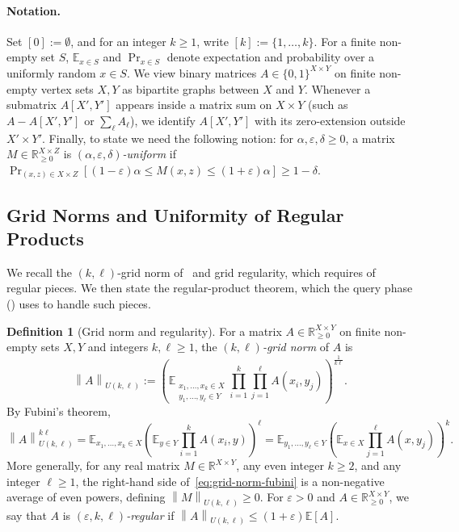\documentclass[11pt]{article}
\theoremstyle{definition}
\newtheorem{definition}{Definition}[section]
\renewcommand{\label}[1]{}%
\newcommand{\E}{\mathbb{E}}
\newcommand{\R}{\mathbb{R}}
\newcommand{\norm}[1]{\left\lVert #1 \right\rVert}
\newcommand{\dens}[1]{\E[#1]}
\begin{document}
\paragraph{Notation.}
Set $[0] := \emptyset$, and for an integer $k \ge 1$, write $[k] := \{1, \dots, k\}$. For a finite non-empty set $S$, $\E_{x \in S}$ and $\Pr_{x \in S}$ denote expectation and probability over a uniformly random $x \in S$. We view binary matrices $A \in \{0, 1\}^{X \times Y}$ on finite non-empty vertex sets $X, Y$ as bipartite graphs between $X$ and $Y$. Whenever a submatrix $A[X', Y']$ appears inside a matrix sum on $X \times Y$ (such as $A - A[X', Y']$ or $\sum_\ell A_\ell$), we identify $A[X', Y']$ with its zero-extension outside $X' \times Y'$. Finally, to state  we need the following notion: for $\alpha, \varepsilon, \delta \ge 0$, a matrix $M \in \R_{\ge 0}^{X \times Z}$ is \emph{$(\alpha, \varepsilon, \delta)$-uniform} if $\Pr_{(x, z) \in X \times Z}[(1 - \varepsilon)\alpha \le M(x, z) \le (1 + \varepsilon)\alpha] \ge 1 - \delta$.

\subsection{Grid Norms and Uniformity of Regular Products}
\label{sec:grid-norms}

We recall the $(k, \ell)$-grid norm of~\cite{KelleyLM23,AFKLM24} and grid regularity, which  requires of regular pieces. We then state the regular-product theorem, which the query phase () uses to handle such pieces.

\begin{definition}[Grid norm and regularity]
\label{def:grid-norm}
For a matrix $A \in \R_{\ge 0}^{X \times Y}$ on finite non-empty sets $X, Y$ and integers $k, \ell \ge 1$, the \emph{$(k, \ell)$-grid norm} of $A$ is
\begin{equation}\label{eq:grid-norm-def}
    \norm{A}_{U(k, \ell)} := \left( \E_{\substack{x_1, \dots, x_k \in X \\ y_1, \dots, y_\ell \in Y}} \prod_{i=1}^k \prod_{j=1}^\ell A(x_i, y_j) \right)^{\frac{1}{k\ell}}.
\end{equation}
By Fubini's theorem,
\begin{equation}\label{eq:grid-norm-fubini}
    \norm{A}_{U(k, \ell)}^{k\ell} = \E_{x_1, \dots, x_k \in X} \left( \E_{y \in Y} \prod_{i=1}^k A(x_i, y) \right)^\ell = \E_{y_1, \dots, y_\ell \in Y} \left( \E_{x \in X} \prod_{j=1}^\ell A(x, y_j) \right)^k.
\end{equation}
More generally, for any real matrix $M \in \R^{X \times Y}$, any even integer $k \ge 2$, and any integer $\ell \ge 1$, the right-hand side of~\eqref{eq:grid-norm-fubini} is a non-negative average of even powers, defining $\norm{M}_{U(k, \ell)} \ge 0$. For $\varepsilon > 0$ and $A \in \R_{\ge 0}^{X \times Y}$, we say that $A$ is \emph{$(\varepsilon, k, \ell)$-regular} if $\norm{A}_{U(k, \ell)} \le (1 + \varepsilon)\dens{A}$.
\end{definition}
\end{document}
